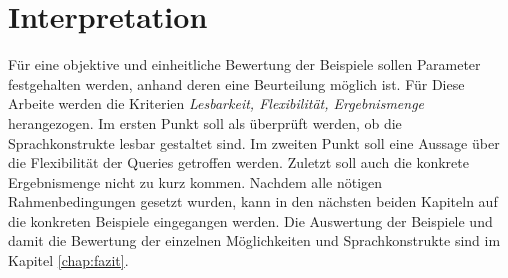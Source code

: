 \section{Interpretation}
\label{sec:interpretatin} Für eine objektive und einheitliche Bewertung der
Beispiele sollen Parameter festgehalten werden, anhand deren eine Beurteilung möglich
ist. Für Diese Arbeite werden die Kriterien \textit{Lesbarkeit, Flexibilität,
Ergebnismenge} herangezogen. Im ersten Punkt soll als überprüft werden, ob die Sprachkonstrukte
lesbar gestaltet sind. Im zweiten Punkt soll eine Aussage über die Flexibilität
der Queries getroffen werden. Zuletzt soll auch die konkrete Ergebnismenge nicht
zu kurz kommen. Nachdem alle nötigen Rahmenbedingungen gesetzt wurden, kann in den
nächsten beiden Kapiteln auf die konkreten Beispiele eingegangen werden. Die
Auswertung der Beispiele und damit die Bewertung der einzelnen Möglichkeiten und
Sprachkonstrukte sind im Kapitel \ref{chap:fazit}.